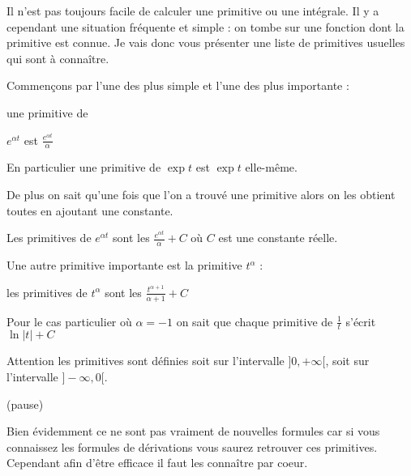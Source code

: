 







\debuttexte

\diapo

Il n'est pas toujours facile de calculer une primitive ou une intégrale.
Il y a cependant une situation fréquente et simple : on tombe sur une fonction
dont la primitive est connue.
Je vais donc vous présenter une liste de primitives usuelles qui sont à connaître.


\diapo

Commençons par l'une des plus simple et l'une des plus importante :

une primitive de 

$e^{\alpha t}$ est $\frac{e^{\alpha t}}{\alpha}$

En particulier une primitive de $\exp t$ est $\exp t$ elle-même.

De plus on sait qu'une fois que l'on a trouvé une primitive alors 
on les obtient toutes en ajoutant une constante.

Les primitives de 
$e^{\alpha t}$ sont les  $\frac{e^{\alpha t}}{\alpha}+ C$ où $C$ est une constante réelle.

\change

Une autre primitive importante est 
la primitive $t^{\alpha}$ :

les primitives de  $t^{\alpha}$ sont les $\frac{t^{\alpha +1}}{\alpha+1}+C$

\change

Pour le cas particulier où $\alpha=-1$
on sait que chaque primitive de $\frac{1}{t}$ s'écrit $\ln|t|+C$

Attention les primitives sont définies soit sur l'intervalle $]0,+\infty[$, soit
 sur l'intervalle $]-\infty,0[$.

(pause)

Bien évidemment ce ne sont pas vraiment de nouvelles formules car si vous connaissez les 
formules de dérivations vous saurez retrouver ces primitives. 
Cependant afin d'être efficace il faut les connaître par coeur.


\diapo

